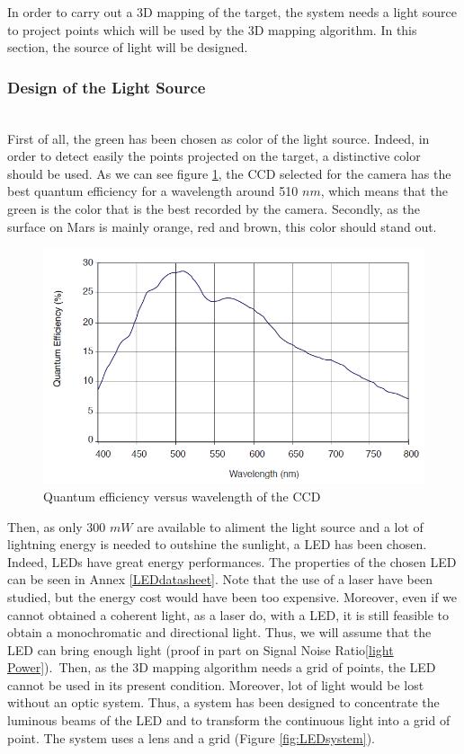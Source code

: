 In order to carry out a 3D mapping of the target, the system needs a light source to project points which will be used by the 3D mapping algorithm. In this section, the source of light will be designed.

\subsubsection{Design of the Light Source}
~\\
First of all, the green has been chosen as color of the light source. Indeed, in order to detect easily the points projected on the target, a distinctive color should be used. As we can see figure \ref{fig:QeCCD}, the CCD selected for the camera has the best quantum efficiency for a wavelength around 510 $nm$, which means that the green is the color that is the best recorded by the camera. Secondly, as the surface on Mars is mainly orange, red and brown, this color should stand out.


\begin{figure}[h]
  \centerline{\includegraphics[scale=0.6]{fig/QeCCD.png}}
  \caption{Quantum efficiency versus wavelength of the CCD}
  \label{fig:QeCCD}
\end{figure}

Then, as only 300 $mW$ are available to aliment the light source and a lot of lightning energy is needed to outshine the sunlight, a LED has been chosen. Indeed, LEDs have great energy performances. The properties of the chosen LED can be seen in Annex \ref{LEDdatasheet}. Note that the use of a laser have been studied, but the energy cost would have been too expensive. Moreover, even if we cannot obtained a coherent light, as a laser do, with a LED, it is still feasible to obtain a monochromatic and directional light. Thus, we will assume that the LED can bring enough light (proof in part on Signal Noise Ratio\ref{light Power}).\
Then, as the 3D mapping algorithm needs a grid of points, the LED cannot be used in its present condition. Moreover, lot of light would be lost without an optic system. Thus, a system has been designed to concentrate the luminous beams of the LED and to transform the continuous light into a grid of point. The system uses a lens and a grid (Figure \ref{fig:LEDsystem}). 

